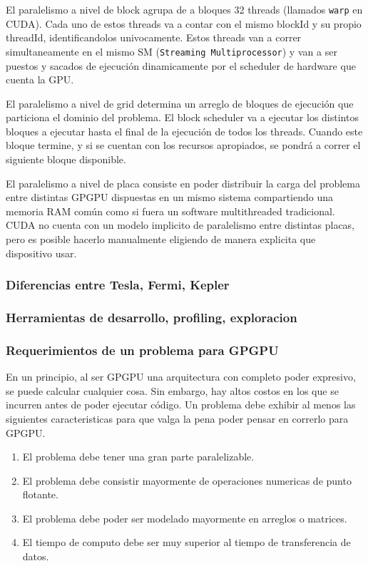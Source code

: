 El paralelismo a nivel de block agrupa de a bloques 32 threads (llamados \texttt{warp} en CUDA).
Cada uno de estos threads va a contar con el mismo blockId y su propio threadId, identificandolos univocamente.
Estos threads van a correr simultaneamente en el mismo SM (\texttt{Streaming Multiprocessor}) y
van a ser puestos y sacados de ejecuci\'on dinamicamente por el scheduler de hardware que cuenta la GPU.

El paralelismo a nivel de grid determina un arreglo de bloques de ejecuci\'on que particiona
el dominio del problema. El block scheduler va a ejecutar los distintos bloques a ejecutar hasta
el final de la ejecuci\'on de todos los threads. Cuando este bloque termine, y si se cuentan con
los recursos apropiados, se pondr\'a a correr el siguiente bloque disponible.

El paralelismo a nivel de placa consiste en poder distribuir la carga del problema entre distintas
GPGPU dispuestas en un mismo sistema compartiendo una memoria RAM com\'un como si fuera un software
multithreaded tradicional. CUDA no cuenta con un modelo implicito de paralelismo entre distintas placas,
pero es posible hacerlo manualmente eligiendo de manera explicita que dispositivo usar.

\subsubsection{Diferencias entre Tesla, Fermi, Kepler}

\subsubsection{Herramientas de desarrollo, profiling, exploracion}

\subsubsection{Requerimientos de un problema para GPGPU}
En un principio, al ser GPGPU una arquitectura con completo poder expresivo, se puede
calcular cualquier cosa. Sin embargo, hay altos costos en los que se incurren antes de
poder ejecutar c\'odigo. Un problema debe exhibir al menos las siguientes caracteristicas
para que valga la pena poder pensar en correrlo para GPGPU.
\begin{enumerate}
  \item \label{req:paralelo} El problema debe tener una gran parte paralelizable.
  \item \label{req:float} El problema debe consistir mayormente de operaciones numericas de punto flotante.
  \item \label{req:matrix} El problema debe poder ser modelado mayormente en arreglos o matrices.
  \item \label{req:transf} El tiempo de computo debe ser muy superior al tiempo de transferencia de datos.
\end{enumerate}

